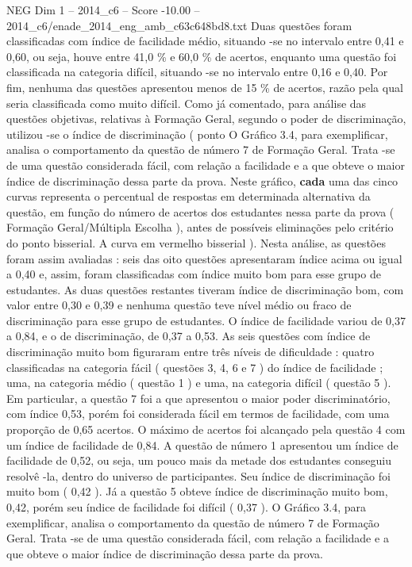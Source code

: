 \begin{textsample}{NEG Dim 1 – 2014\_c6 – Score -10.00 – 2014\_c6/enade\_2014\_eng\_amb\_c63c648bd8.txt}
Duas questões foram classificadas com índice de facilidade médio, situando -se no intervalo entre 0,41 e 0,60, ou seja, houve entre 41,0 \% e 60,0 \% de acertos, enquanto uma questão foi classificada na categoria difícil, situando -se no intervalo entre 0,16 e 0,40.
Por fim, nenhuma das questões apresentou menos de 15 \% de acertos, razão pela qual seria classificada como muito difícil.
Como já comentado, para análise das questões objetivas, relativas à Formação Geral, segundo o poder de discriminação, utilizou -se o índice de discriminação ( ponto O Gráfico 3.4, para exemplificar, analisa o comportamento da questão de número 7 de Formação Geral.
Trata -se de uma questão considerada fácil, com relação a facilidade e a que obteve o maior índice de discriminação dessa parte da prova.
Neste gráfico, \textbf{cada} uma das cinco curvas representa o percentual de respostas em determinada alternativa da questão, em função do número de acertos dos estudantes nessa parte da prova ( Formação Geral/Múltipla Escolha ), antes de possíveis eliminações pelo critério do ponto bisserial.
A curva em vermelho bisserial ).
Nesta análise, as questões foram assim avaliadas : seis das oito questões apresentaram índice acima ou igual a 0,40 e, assim, foram classificadas com índice muito bom para esse grupo de estudantes.
As duas questões restantes tiveram índice de discriminação bom, com valor entre 0,30 e 0,39 e nenhuma questão teve nível médio ou fraco de discriminação para esse grupo de estudantes.
O índice de facilidade variou de 0,37 a 0,84, e o de discriminação, de 0,37 a 0,53.
As seis questões com índice de discriminação muito bom figuraram entre três níveis de dificuldade : quatro classificadas na categoria fácil ( questões 3, 4, 6 e 7 ) do índice de facilidade ; uma, na categoria médio ( questão 1 ) e uma, na categoria difícil ( questão 5 ).
Em particular, a questão 7 foi a que apresentou o maior poder discriminatório, com índice 0,53, porém foi considerada fácil em termos de facilidade, com uma proporção de 0,65 acertos.
O máximo de acertos foi alcançado pela questão 4 com um índice de facilidade de 0,84.
A questão de número 1 apresentou um índice de facilidade de 0,52, ou seja, um pouco mais da metade dos estudantes conseguiu resolvê -la, dentro do universo de participantes.
Seu índice de discriminação foi muito bom ( 0,42 ).
Já a questão 5 obteve índice de discriminação muito bom, 0,42, porém seu índice de facilidade foi difícil ( 0,37 ).
O Gráfico 3.4, para exemplificar, analisa o comportamento da questão de número 7 de Formação Geral.
Trata -se de uma questão considerada fácil, com relação a facilidade e a que obteve o maior índice de discriminação dessa parte da prova.

\end{textsample}
